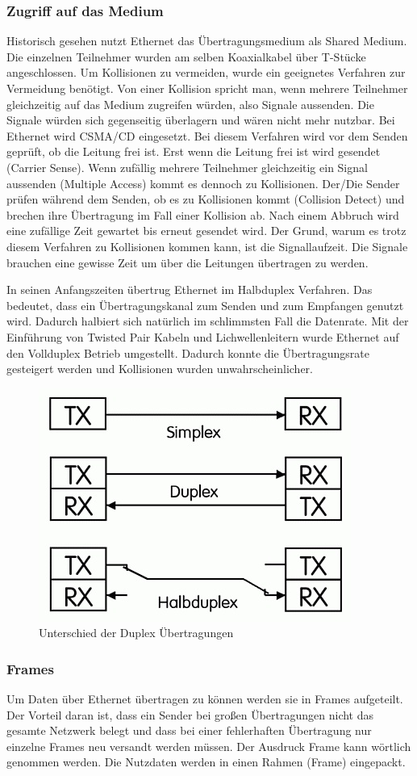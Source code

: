 \documentclass[12pt, a4paper, ngerman]{article}
\begin{document}
\subsubsection{Zugriff auf das Medium}
Historisch gesehen nutzt Ethernet das Übertragungsmedium als Shared Medium. Die einzelnen Teilnehmer wurden am selben Koaxialkabel über T-Stücke angeschlossen. Um Kollisionen zu vermeiden, wurde ein geeignetes Verfahren zur Vermeidung benötigt. Von einer Kollision spricht man, wenn mehrere Teilnehmer gleichzeitig auf das Medium zugreifen würden, also Signale aussenden. Die Signale würden sich gegenseitig überlagern und wären nicht mehr nutzbar. Bei Ethernet wird CSMA/CD eingesetzt. Bei diesem Verfahren wird vor dem Senden geprüft, ob die Leitung frei ist. Erst wenn die Leitung frei ist wird gesendet (Carrier Sense). Wenn zufällig mehrere Teilnehmer gleichzeitig ein Signal aussenden (Multiple Access) kommt es dennoch zu Kollisionen. Der/Die Sender prüfen während dem Senden, ob es zu Kollisionen kommt (Collision Detect) und brechen ihre Übertragung im Fall einer Kollision ab. Nach einem Abbruch wird eine zufällige Zeit gewartet bis erneut gesendet wird. Der Grund, warum es trotz diesem Verfahren zu Kollisionen kommen kann, ist die Signallaufzeit. Die Signale brauchen eine gewisse Zeit um über die Leitungen übertragen zu werden. 

In seinen Anfangszeiten übertrug Ethernet im Halbduplex Verfahren. Das bedeutet, dass ein Übertragungskanal zum Senden und zum Empfangen genutzt wird. Dadurch halbiert sich natürlich im schlimmsten Fall die Datenrate. Mit der Einführung von Twisted Pair Kabeln und Lichwellenleitern wurde Ethernet auf den Vollduplex Betrieb umgestellt. Dadurch konnte die Übertragungsrate gesteigert werden und Kollisionen wurden unwahrscheinlicher.
\begin{figure}[H]
	\centering
	\includegraphics[width=0.4\linewidth]{Grafiken/duplex.jpg}
	\caption{Unterschied der Duplex Übertragungen \cite{duplex}}
	\label{duplex}
\end{figure}
 
 \subsubsection{Frames}
Um Daten über Ethernet übertragen zu können werden sie in Frames aufgeteilt. Der Vorteil daran ist, dass ein Sender bei großen Übertragungen nicht das gesamte Netzwerk belegt und dass bei einer fehlerhaften Übertragung nur einzelne Frames neu versandt werden müssen. Der Ausdruck Frame kann wörtlich genommen werden. Die Nutzdaten werden in einen Rahmen (Frame) eingepackt.
\end{document}
